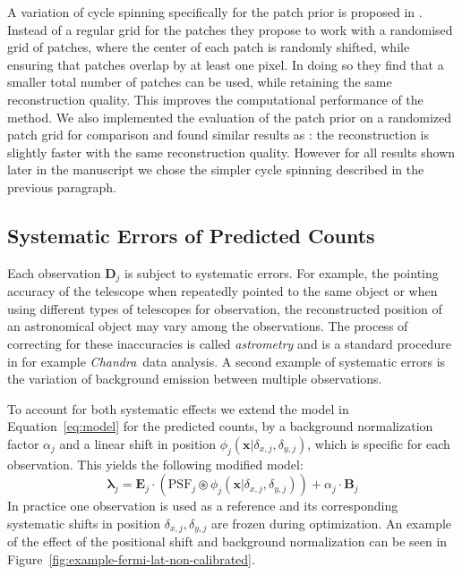 \documentclass[twocolumn, linenumbers]{aastex631}
\newcommand{\chandra}{\textit{Chandra}~}
\begin{document}
    A variation of cycle spinning specifically for the patch prior is proposed in \cite{Parameswaran2018}. Instead of a regular grid for the patches they propose to work with a randomised grid of patches, where the center of each patch is randomly shifted, while ensuring that patches overlap by at least one pixel. In doing so they find that a smaller total number of patches can be used, while retaining the same reconstruction quality. This improves the computational performance of the method. We also implemented the evaluation of the patch prior on a randomized patch grid for comparison and found similar results as \cite{Parameswaran2018}: the reconstruction is slightly faster with the same reconstruction quality. However for all results shown later in the manuscript we chose the simpler cycle spinning described in the previous paragraph.

    \subsection{Systematic Errors of Predicted Counts}
    Each observation $\mathbf{D}_j$ is subject to systematic errors. For example, the pointing accuracy of the telescope when repeatedly pointed to the same object or when using different types of telescopes for observation, the reconstructed position of an astronomical object may vary among the observations. The process of correcting for these inaccuracies is called \textit{astrometry} and is a standard procedure in for example \chandra data analysis. A second example of systematic errors is the variation of background emission between multiple observations.
    
    To account for both systematic effects we extend the model in Equation~\ref{eq:model} for the predicted counts, by a background normalization factor $\alpha_j$ and a linear shift in position $\phi_j(\mathbf{x}| \delta_{x,j}, \delta_{y,j})$, which is specific for each observation. This yields the following modified model:
    \begin{equation}
        \label{eq:model-npred-calibration}
        \mathbf{\lambda}_j = \mathbf{E}_j \cdot  \left(\mathrm{PSF}_j \circledast \phi_j(\mathbf{x}| \delta_{x,j}, \delta_{y,j})\right) + \alpha_j \cdot \mathbf{B}_j
    \end{equation}
    In practice one observation is used as a reference and its corresponding systematic shifts in position $\delta_{x,j}, \delta_{y,j}$ are frozen during optimization. An example of the effect of the positional shift and background normalization can be seen in Figure~\ref{fig:example-fermi-lat-non-calibrated}.
\end{document}
